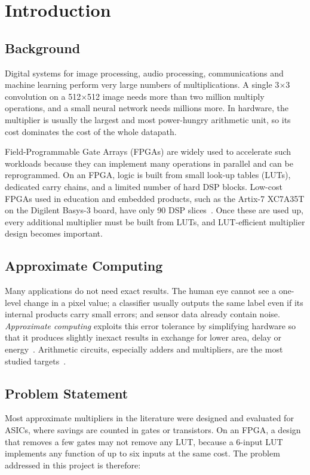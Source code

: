 \documentclass[12pt,a4paper,oneside]{report}
\begin{document}
\clearpage
{}

\chapter{Introduction}

\section{Background}
Digital systems for image processing, audio processing, communications and machine learning perform very large numbers of multiplications. A single 3$\times$3 convolution on a 512$\times$512 image needs more than two million multiply operations, and a small neural network needs millions more. In hardware, the multiplier is usually the largest and most power-hungry arithmetic unit, so its cost dominates the cost of the whole datapath.

Field-Programmable Gate Arrays (FPGAs) are widely used to accelerate such workloads because they can implement many operations in parallel and can be reprogrammed. On an FPGA, logic is built from small look-up tables (LUTs), dedicated carry chains, and a limited number of hard DSP blocks. Low-cost FPGAs used in education and embedded products, such as the Artix-7 XC7A35T on the Digilent Basys-3 board, have only 90 DSP slices~\cite{basys3rm}. Once these are used up, every additional multiplier must be built from LUTs, and LUT-efficient multiplier design becomes important.

\section{Approximate Computing}
Many applications do not need exact results. The human eye cannot see a one-level change in a pixel value; a classifier usually outputs the same label even if its internal products carry small errors; and sensor data already contain noise. \emph{Approximate computing} exploits this error tolerance by simplifying hardware so that it produces slightly inexact results in exchange for lower area, delay or energy~\cite{han2013approximate,mittal2016survey}. Arithmetic circuits, especially adders and multipliers, are the most studied targets~\cite{jiang2020survey}.

\section{Problem Statement}
Most approximate multipliers in the literature were designed and evaluated for ASICs, where savings are counted in gates or transistors. On an FPGA, a design that removes a few gates may not remove any LUT, because a 6-input LUT implements any function of up to six inputs at the same cost. The problem addressed in this project is therefore:
\end{document}
